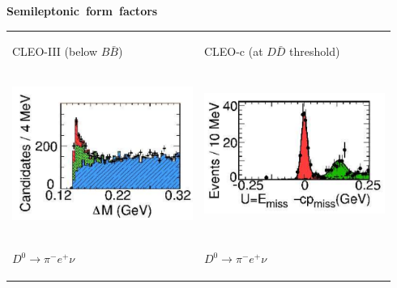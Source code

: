 \documentclass[landscape]{article}
\newenvironment{slide}[1][ ]{\mbox{\bf \boldmath #1 } \vfill}{\vfill \vspace{-1.5 cm} \mbox{ } \pagebreak}
\begin{document}
\begin{slide}[Semileptonic form factors]
\begin{tabular}{p{0.47\linewidth} p{0.47\linewidth}}
  \begin{minipage}{\linewidth}
    \begin{center}
      CLEO-III (below $B\bar{B}$)
    \end{center}
  \end{minipage} & 
  \begin{minipage}{\linewidth}
    \begin{center}
      CLEO-c (at $D\bar{D}$ threshold)
    \end{center}
  \end{minipage} \\
  \begin{minipage}{\linewidth}
    \begin{center} \includegraphics[width=0.6\linewidth]{semilep_lauren3} \end{center}
  \end{minipage} &
  \begin{minipage}{\linewidth}
    \vspace{0.5 cm}

    \begin{center} \includegraphics[width=0.6\linewidth]{semilep_feng3} \end{center}
  \end{minipage} \\
  \begin{minipage}{\linewidth}
    \begin{center}
      \LARGE $D^0 \to {\pi^-} e^+ \nu$
    \end{center}
  \end{minipage} & 
  \begin{minipage}{\linewidth}
    \begin{center}
      \LARGE $D^0 \to {\pi^-} e^+ \nu$
    \end{center}
  \end{minipage}
\end{tabular}

\end{slide}
\end{document}
